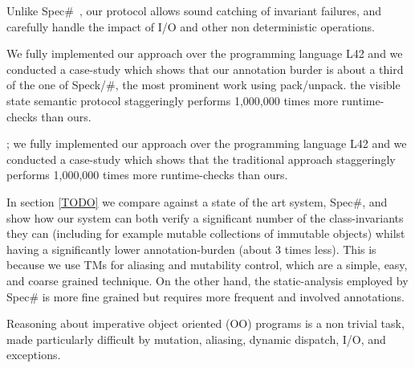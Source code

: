 Unlike Spec\#~\cite{?}, our protocol allows sound catching of invariant failures, and carefully handle
the impact of I/O and other non deterministic operations.

We fully implemented our approach over the programming language L42 and we conducted a case-study which shows that our annotation burder is about a third of the one of Speck/#, the most prominent work using pack/unpack. the visible state semantic protocol  staggeringly performs 1,000,000 times more runtime-checks than ours.

; we fully implemented our approach over the programming language L42 and we conducted a case-study which shows that the traditional approach staggeringly performs 1,000,000 times more runtime-checks than ours.

In section \ref{TODO} we compare against a state of the art system, Spec\#, and show how our system can both verify a significant number of the class-invariants they can (including for example mutable collections of immutable objects) whilst having a significantly lower annotation-burden (about 3 times less).
This is because we use TMs for aliasing and mutability control, which are a simple, easy, and coarse grained
technique. On the other hand, the static-analysis employed by Spec\# is more fine grained but requires more frequent and involved annotations.

\LINE

Reasoning about imperative object oriented (OO) programs is a non trivial task,
made particularly difficult by mutation, aliasing, dynamic dispatch, I/O, and exceptions. 

